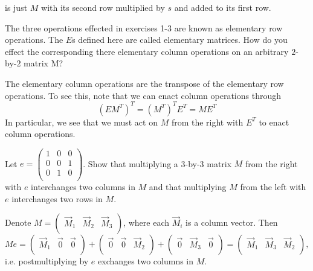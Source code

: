 \documentclass[../group-theory-in-a-nutshell-for-physicists.tex]{subfiles}
\begin{document}
\begin{questions}
\begin{solution}
	is just $M$ with its second row multiplied by $s$ and added to its first row.
\end{solution}

\question The three operations effected in exercises 1-3 are known as elementary
row operations. The $E$s defined here are called elementary matrices.
How do you effect the corresponding there elementary column operations
on an arbitrary $2$-by-$2$ matrix M?

\begin{solution}
	The elementary column operations are the transpose of the elementary row operations. To see this, note that we can enact column operations through
	\[
		(EM^T)^T = (M^T)^TE^T = ME^T
	\]
	In particular, we see that we must act on $M$ from the right with $E^T$ to enact column operations.
\end{solution}

\question Let $e = \begin{pmatrix}
1 & 0 & 0 \\
0 & 0 & 1 \\
0 & 1 & 0 \\
\end{pmatrix}$. Show that multiplying a 3-by-3 matrix $M$ from the
right with $e$ interchanges two columns in $M$ and that multiplying
$M$ from the left with $e$ interchanges two rows in $M$.

\begin{solution}
Denote $M = \begin{pmatrix}
{\overrightarrow{M}}_{1} & {\overrightarrow{M}}_{2} & {\overrightarrow{M}}_{3} \\
\end{pmatrix}$, where each ${\overrightarrow{M}}_{i}$ is a column
vector. Then
\[Me = \begin{pmatrix}
{\overrightarrow{M}}_{1} & \overrightarrow{0} & \overrightarrow{0} \\
\end{pmatrix} + \begin{pmatrix}
\overrightarrow{0} & \overrightarrow{0} & {\overrightarrow{M}}_{2} \\
\end{pmatrix} + \begin{pmatrix}
\overrightarrow{0} & {\overrightarrow{M}}_{3} & \overrightarrow{0} \\
\end{pmatrix} = \begin{pmatrix}
{\overrightarrow{M}}_{1} & {\overrightarrow{M}}_{3} & {\overrightarrow{M}}_{2} \\
\end{pmatrix},
\]
i.e. postmultiplying by $e$ exchanges two columns in $M$.


\end{solution}
\end{questions}
\end{document}
